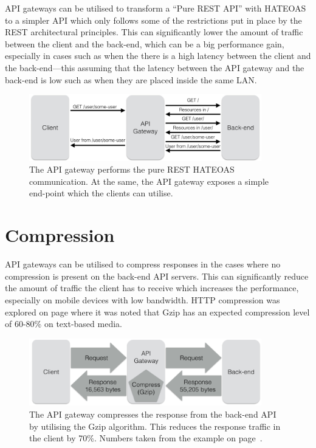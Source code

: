 \documentclass{cslthse-msc}
\begin{document}
API gateways can be utilised to transform a \enquote{Pure REST API} with HATEOAS to a simpler API which only follows some of the restrictions put in place by the REST architectural principles. This can significantly lower the amount of traffic between the client and the back-end, which can be a big performance gain, especially in cases such as when the there is a high latency between the client and the back-end---this assuming that the latency between the API gateway and the back-end is low such as when they are placed inside the same LAN.

\begin{figure}[H]
  \centering
    \begin{center}
      \includegraphics[width=0.9\textwidth]{images/api_gateway_hateoas.png}
    \end{center}
  \caption{The API gateway performs the pure REST HATEOAS communication. At the same, the API gateway exposes a simple end-point which the clients can utilise.}
\end{figure}

\section{Compression}
API gateways can be utilised to compress responses in the cases where no compression is present on the back-end API servers. This can significantly reduce the amount of traffic the client has to receive which increases the performance, especially on mobile devices with low bandwidth. HTTP compression was explored on page \pageref{compression} where it was noted that Gzip has an expected compression level of 60-80\% on text-based media.

\begin{figure}[H]
  \centering
    \begin{center}
      \includegraphics[width=0.9\textwidth]{images/api_gateway_compression.png}
    \end{center}
  \caption{The API gateway compresses the response from the back-end API by utilising the Gzip algorithm. This reduces the response traffic in the client by 70\%. Numbers taken from the example on page~\pageref{compression}.}
\end{figure}
\end{document}
